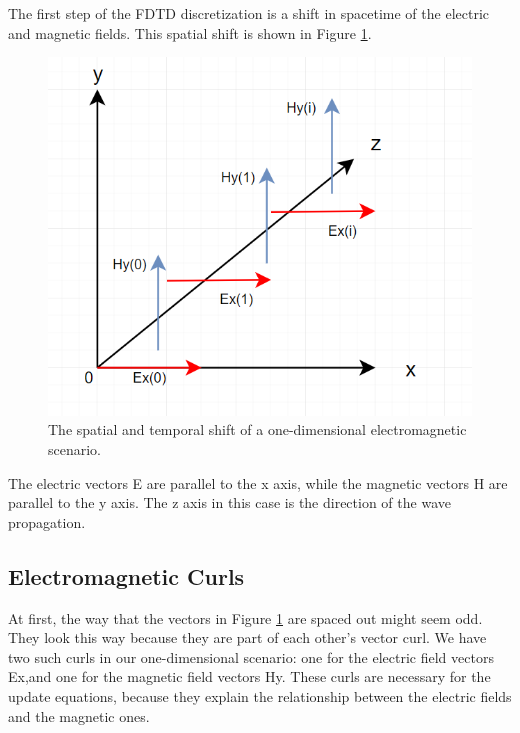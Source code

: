 The first step of the FDTD discretization is a shift in spacetime of the electric and magnetic fields. This spatial shift is shown in Figure \ref{fig:fdtd1dDiscretized}.

\begin{figure}
	\centering
	\includegraphics[scale=0.7]{Figures/fdtd1dDiscretized}
	\decoRule
	\caption[1D Spatial and Temporal Shift - TEM Mode]{The spatial and temporal shift of a one-dimensional electromagnetic scenario.}
	\label{fig:fdtd1dDiscretized}
\end{figure}

The electric vectors E are parallel to the x axis, while the magnetic vectors H are parallel to the y axis. The z axis in this case is the direction of the wave propagation.


\subsection{Electromagnetic Curls}

At first, the way that the vectors in Figure \ref{fig:fdtd1dDiscretized} are spaced out might seem odd. They look this way because they are part of each other's vector curl. We have two such curls in our one-dimensional scenario: one for the electric field vectors Ex,and one for the magnetic field vectors Hy. These curls are necessary for the update equations, because they explain the relationship between the electric fields and the magnetic ones.

